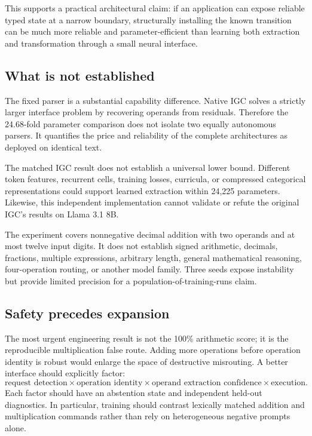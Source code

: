 \documentclass[11pt]{article}
\begin{document}
This supports a practical architectural claim: if an application can expose
reliable typed state at a narrow boundary, structurally installing the known
transition can be much more reliable and parameter-efficient than learning
both extraction and transformation through a small neural interface.

\subsection{What is not established}

The fixed parser is a substantial capability difference. Native IGC solves a
strictly larger interface problem by recovering operands from residuals.
Therefore the 24.68-fold parameter comparison does not isolate two equally
autonomous parsers. It quantifies the price and reliability of the complete
architectures as deployed on identical text.

The matched IGC result does not establish a universal lower bound. Different
token features, recurrent cells, training losses, curricula, or compressed
categorical representations could support learned extraction within 24,225
parameters. Likewise, this independent implementation cannot validate or
refute the original IGC's results on Llama 3.1 8B.

The experiment covers nonnegative decimal addition with two operands and at
most twelve input digits. It does not establish signed arithmetic, decimals,
fractions, multiple expressions, arbitrary length, general mathematical
reasoning, four-operation routing, or another model family. Three seeds expose
instability but provide limited precision for a population-of-training-runs
claim.

\subsection{Safety precedes expansion}

The most urgent engineering result is not the 100\% arithmetic score; it is
the reproducible multiplication false route. Adding more operations before
operation identity is robust would enlarge the space of destructive
misrouting. A better interface should explicitly factor:
\[
\text{request detection}
\times
\text{operation identity}
\times
\text{operand extraction confidence}
\times
\text{execution}.
\]
Each factor should have an abstention state and independent held-out
diagnostics. In particular, training should contrast lexically matched
addition and multiplication commands rather than rely on heterogeneous
negative prompts alone.
\end{document}
